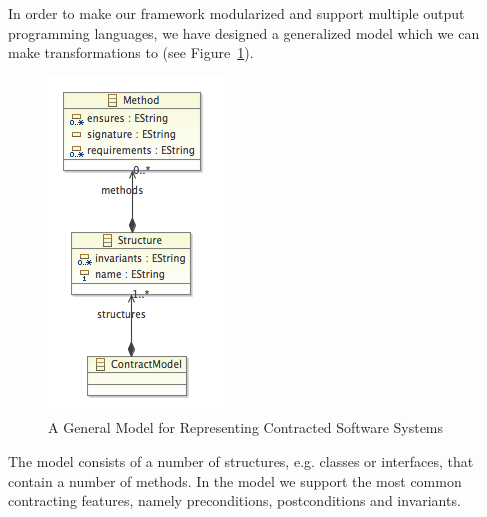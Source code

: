 In order to make our framework modularized and support multiple output programming languages, we have designed a generalized model which
we can make transformations to (see Figure~\ref{fig:generaloutputmodel}).

\begin{figure}
  \begin{center}
    \includegraphics[scale=0.35]{images/generalized_outputmodel.png}
  \end{center}
  \caption{A General Model for Representing Contracted Software Systems}
  \label{fig:generaloutputmodel}
\end{figure}

The model consists of a number of structures, e.g. classes or interfaces, that contain a number of methods.
In the model we support the most common contracting features, namely preconditions, postconditions and invariants.

